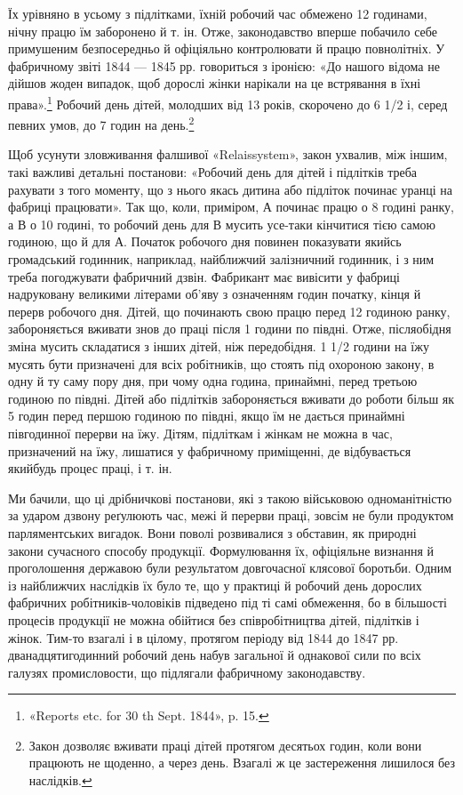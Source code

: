 \parcont{}  %
Їх урівняно в усьому з підлітками, їхній робочий час обмежено
12 годинами, нічну працю їм заборонено й т. ін. Отже, законодавство
вперше побачило себе примушеним безпосередньо й офіціяльно
контролювати й працю повнолітніх. У фабричному звіті 1844 —
1845 рр. говориться з іронією: «До нашого відома не дійшов
жоден випадок, щоб дорослі жінки нарікали на це встрявання
в їхні права».\footnote{
«Reports etc. for 30 th Sept. 1844», p. 15.
} Робочий день дітей, молодших від 13 років,
скорочено до 6 1/2 і, серед певних умов, до 7 годин на день.\footnote{
Закон дозволяє вживати праці дітей протягом десятьох годин,
коли вони працюють не щоденно, а через день. Взагалі ж це застереження
лишилося без наслідків.
}

Щоб усунути зловживання фалшивої «Relaissystem», закон
ухвалив, між іншим, такі важливі детальні постанови: «Робочий
день для дітей і підлітків треба рахувати з того моменту, що з
нього якась дитина або підліток починає уранці на фабриці
працювати». Так що, коли, приміром, А починає працю о 8 годині
ранку, а В о 10 годині, то робочий день для В мусить усе-таки кінчитися тією самою годиною, що й для
А. Початок робочого
дня повинен показувати якийсь громадський годинник, наприклад,
найближчий залізничний годинник, і з ним треба погоджувати
фабричний дзвін. Фабрикант має вивісити у фабриці надруковану
великими літерами об’яву з означенням годин початку,
кінця й перерв робочого дня. Дітей, що починають свою працю
перед 12 годиною ранку, забороняється вживати знов до праці
після 1 години по півдні. Отже, післяобідня зміна мусить складатися
з інших дітей, ніж передобідня. 1 1/2 години на їжу мусять
бути призначені для всіх робітників, що стоять під охороною закону,
в одну й ту саму пору дня, при чому одна година, принаймні,
перед третьою годиною по півдні. Дітей або підлітків забороняється
вживати до роботи більш як 5 годин перед першою годиною
по півдні, якщо їм не дається принаймні півгодинної перерви на
їжу. Дітям, підліткам і жінкам не можна в час, призначений на
їжу, лишатися у фабричному приміщенні, де відбувається якийбудь
процес праці, і т. ін.

Ми бачили, що ці дрібничкові постанови, які з такою військовою
одноманітністю за ударом дзвону реґулюють час, межі й
перерви праці, зовсім не були продуктом парляментських вигадок.
Вони поволі розвивалися з обставин, як природні закони
сучасного способу продукції. Формулювання їх, офіціяльне
визнання й проголошення державою були результатом довгочасної
клясової боротьби. Одним із найближчих наслідків їх
було те, що у практиці й робочий день дорослих фабричних робітників-чоловіків
підведено під ті самі обмеження, бо в більшості
процесів продукції не можна обійтися без співробітництва дітей,
підлітків і жінок. Тим-то взагалі і в цілому, протягом періоду
від 1844 до 1847 рр. дванадцятигодинний робочий день набув загальної
й однакової сили по всіх галузях промисловости, що
підлягали фабричному законодавству.
